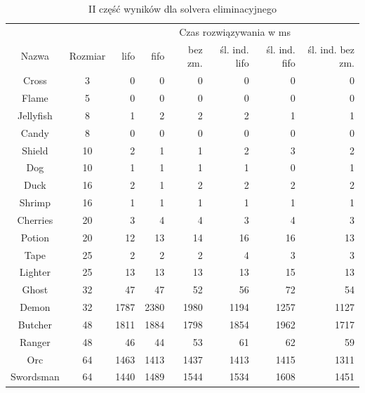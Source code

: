 \begin{table}[h!]
    \begin{center}
        \begin{tabular}{|c|c|r r r r r r|}
            \hline
            {}          & {}        & \multicolumn{6}{c|}{Czas rozwiązywania w ms} \\
            Nazwa       & Rozmiar   & lifo & fifo & bez zm. & śl. ind. lifo & śl. ind. fifo & śl. ind. bez zm. \\
            \hline
            Cross       & 3         & 0     & 0     & 0     & 0     & 0     & 0     \\
            Flame       & 5         & 0     & 0     & 0     & 0     & 0     & 0     \\
            Jellyfish   & 8         & 1     & 2     & 2     & 2     & 1     & 1     \\
            Candy       & 8         & 0     & 0     & 0     & 0     & 0     & 0     \\
            Shield      & 10        & 2     & 1     & 1     & 2     & 3     & 2     \\
            Dog         & 10        & 1     & 1     & 1     & 1     & 0     & 1     \\
            Duck        & 16        & 2     & 1     & 2     & 2     & 2     & 2     \\
            Shrimp      & 16        & 1     & 1     & 1     & 1     & 1     & 1     \\
            Cherries    & 20        & 3     & 4     & 4     & 3     & 4     & 3     \\
            Potion      & 20        & 12    & 13    & 14    & 16    & 16    & 13    \\
            Tape        & 25        & 2     & 2     & 2     & 4     & 3     & 3     \\
            Lighter     & 25        & 13    & 13    & 13    & 13    & 15    & 13    \\
            \hline
            Ghost       & 32        & 47    & 47    & 52    & 56    & 72    & 54    \\
            Demon       & 32        & 1787  & 2380  & 1980  & 1194  & 1257  & 1127  \\
            Butcher     & 48        & 1811  & 1884  & 1798  & 1854  & 1962  & 1717  \\
            Ranger      & 48        & 46    & 44    & 53    & 61    & 62    & 59    \\
            Orc         & 64        & 1463  & 1413  & 1437  & 1413  & 1415  & 1311  \\
            Swordsman   & 64        & 1440  & 1489  & 1544  & 1534  & 1608  & 1451  \\
            \hline
        \end{tabular}
    \end{center}
    \caption{II część wyników dla solvera eliminacyjnego}
\end{table}

